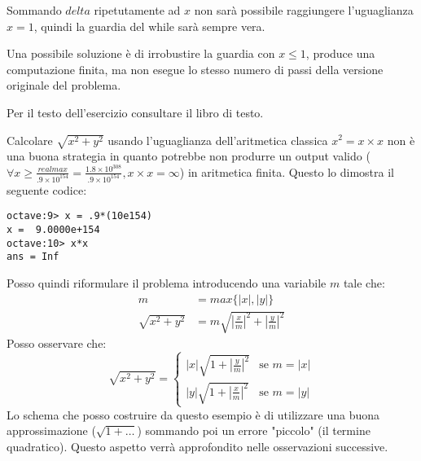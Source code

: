 Sommando $delta$ ripetutamente ad $x$ non sar\`a possibile raggiungere l'uguaglianza
$x = 1$, quindi la guardia del while sar\`a sempre vera.

Una possibile soluzione \`e di irrobustire la guardia con $x \leq 1$, produce una 
computazione finita, ma non esegue lo stesso numero di passi della versione originale
del problema.

\begin{exercise}[1.12]
Per il testo dell'esercizio consultare il libro di testo.
\end{exercise}
Calcolare $\sqrt{x^{2} + y^{2}}$ usando l'uguaglianza dell'aritmetica classica 
$x^{2} = x \times x$ non \`e una buona strategia in quanto potrebbe non produrre
un output valido ($\forall x \geq \frac{realmax}
	{.9 \times 10^{154}} = \frac{1.8 \times 10^{308}}
	{.9 \times 10^{154}}, x \times x = \infty$) 
in aritmetica finita.
Questo lo dimostra il seguente codice:
\begin{lstlisting}
octave:9> x = .9*(10e154)
x =  9.0000e+154
octave:10> x*x
ans = Inf
\end{lstlisting}
Posso quindi riformulare il problema introducendo una variabile $m$ tale che:
\begin{displaymath}
\begin{split}
	m &= max \lbrace |x|, |y| \rbrace \\
	\sqrt{x^{2} + y^{2}} &= m \sqrt{{\left |\frac{x}{m} \right |}^{2} + 
		{\left |\frac{y}{m} \right |}^{2}}
\end{split}
\end{displaymath}
Posso osservare che:
\begin{displaymath}
 \sqrt{x^{2} + y^{2}} = \left \lbrace
		\begin{array}{lc}
			|x| \sqrt{1 + {\left |\frac{y}{m} \right |}^{2}} & \text{se } m = |x| \\ 
			|y| \sqrt{1 + {\left |\frac{x}{m} \right |}^{2}} & \text{se } m = |y|
		\end{array} \right .
\end{displaymath}
Lo schema che posso costruire da questo esempio \`e di utilizzare una buona approssimazione
($\sqrt{1 + \ldots}$) sommando poi un errore "piccolo" (il termine quadratico). Questo aspetto 
verr\`a approfondito nelle osservazioni successive.

